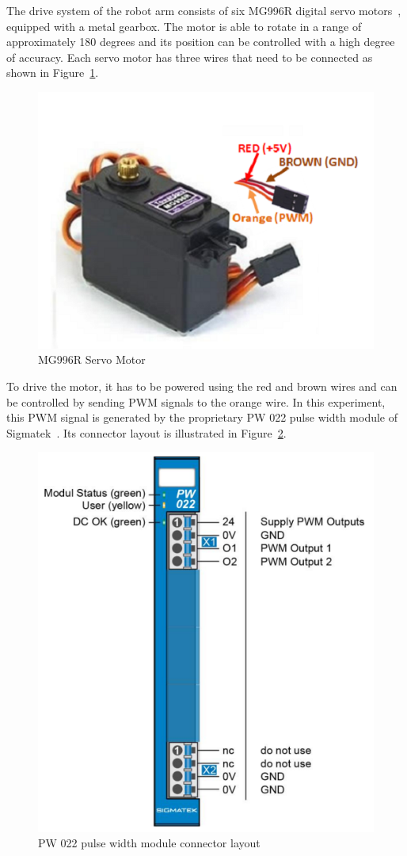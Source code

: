 \documentclass[MMR,Master,english]{twbook}
\begin{document}
\noindent The drive system of the robot arm consists of six MG996R digital servo motors~\cite{MG996RServoMotor}, equipped with a metal gearbox. The motor is able to rotate in a range of approximately 180 degrees and its position can be controlled with a high degree of accuracy. Each servo motor has three wires that need to be connected as shown in Figure~\ref{fig:motor_wires}.

\begin{figure}[H]
	\centering
	\includegraphics[width=0.45\columnwidth]{img/experiment/motor_wires.png}
	\caption[MG996R Servo Motor]{MG996R Servo Motor~\cite{MG996RServoMotor}}
	\label{fig:motor_wires}
\end{figure}

\noindent To drive the motor, it has to be powered using the red and brown wires and can be controlled by sending PWM signals to the orange wire. In this experiment, this PWM signal is generated by the proprietary PW 022 pulse width module of Sigmatek~\cite{DigitalOutputSIGMATEK}. Its connector layout is illustrated in Figure~\ref{fig:pw022_connectors}.

\begin{figure}[H]
	\centering
	\includegraphics[width=0.5\columnwidth]{img/experiment/pw022_connectors.png}
	\caption[PW 022 pulse width module connector layout]{PW 022 pulse width module connector layout~\cite{DigitalOutputSIGMATEK}}
	\label{fig:pw022_connectors}
\end{figure}
\end{document}
